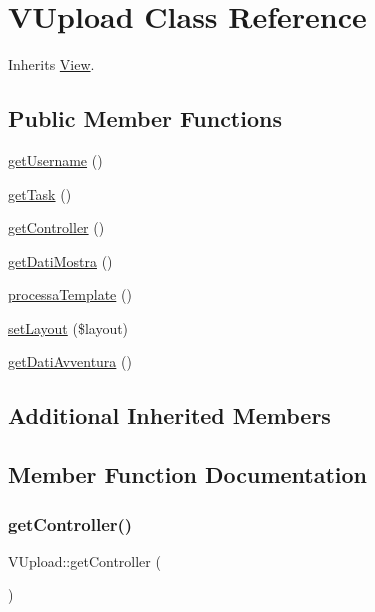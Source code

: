 \hypertarget{class_v_upload}{}\section{V\+Upload Class Reference}
\label{class_v_upload}


Inherits \mbox{\hyperlink{class_view}{View}}.

\subsection*{Public Member Functions}
\begin{DoxyCompactItemize}
\item 
\mbox{\hyperlink{class_v_upload_a40eda7e5af26d0734065a870d1e64bbd}{get\+Username}} ()
\item 
\mbox{\hyperlink{class_v_upload_a56b4c2fa5878156be19ff557b2bf1391}{get\+Task}} ()
\item 
\mbox{\hyperlink{class_v_upload_a28f50c4adb85c410912a6f66e868c814}{get\+Controller}} ()
\item 
\mbox{\hyperlink{class_v_upload_a2e28d01ebb2b23c71a8f91ed94c56bd4}{get\+Dati\+Mostra}} ()
\item 
\mbox{\hyperlink{class_v_upload_ae2eeab5d6f78aecd348c20f9e296b339}{processa\+Template}} ()
\item 
\mbox{\hyperlink{class_v_upload_a5dec9f21c01d72a23db2d8198994f705}{set\+Layout}} (\$layout)
\item 
\mbox{\hyperlink{class_v_upload_a749ab9044ba53189edc5cd96c6913942}{get\+Dati\+Avventura}} ()
\end{DoxyCompactItemize}
\subsection*{Additional Inherited Members}


\subsection{Member Function Documentation}
\mbox{\label{class_v_upload_a28f50c4adb85c410912a6f66e868c814}} 
\subsubsection{\texorpdfstring{get\+Controller()}{getController()}}
{\footnotesize\ttfamily V\+Upload\+::get\+Controller (\begin{DoxyParamCaption}{ }\end{DoxyParamCaption})}

